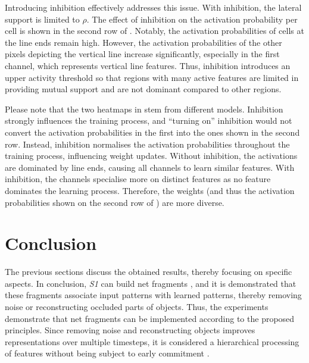 Introducing inhibition effectively addresses this issue.
With inhibition, the lateral support is limited to $\rho$.
The effect of inhibition on the activation probability per cell is shown in the second row of .
Notably, the activation probabilities of cells at the line ends remain high. However, the activation probabilities of the other pixels depicting the vertical line increase significantly, especially in the first channel, which represents vertical line features.
Thus, inhibition introduces an upper activity threshold so that regions with many active features are limited in providing mutual support and are not dominant compared to other regions.

Please note that the two heatmaps in  stem from different models.
Inhibition strongly influences the training process, and ``turning on'' inhibition would not convert the activation probabilities in the first into the ones shown in the second row.
Instead, inhibition normalises the activation probabilities throughout the training process, influencing weight updates.
Without inhibition, the activations are dominated by line ends, causing all channels to learn similar features.
With inhibition, the channels specialise more on distinct features as no feature dominates the learning process. Therefore, the weights (and thus the activation probabilities shown on the second row of ) are more diverse.

\section{Conclusion}
The previous sections discuss the obtained results, thereby focusing on specific aspects.
In conclusion, \emph{S1} can build net fragments , and it is demonstrated that these fragments associate input patterns with learned patterns, thereby removing noise or reconstructing occluded parts of objects.
Thus, the experiments demonstrate that net fragments can be implemented according to the proposed principles.
Since removing noise and reconstructing objects improves representations over multiple timesteps, it is considered a hierarchical processing of features without being subject to early commitment .

